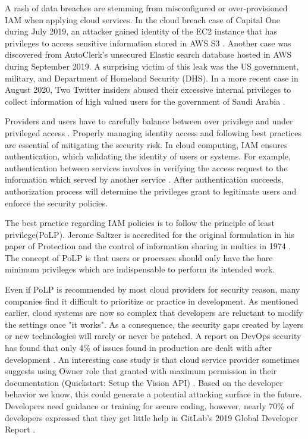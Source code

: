 \documentclass[sigconf]{acmart}
\begin{document}
A rash of data breaches are stemming from misconfigured or over-provisioned IAM when applying cloud services.
In the cloud breach case of Capital One during July 2019, an attacker gained identity of the EC2 instance that has privileges to access sensitive information stored in AWS S3 \cite{Parimi2019}. 
Another case was discovered from AutoClerk's unsecured Elastic search database hosted in AWS during September 2019. A surprising victim of this leak was the US government, military, and Department of Homeland Security (DHS). \cite{Fawkes2020}
In a more recent case in August 2020, Two Twitter insiders abused their excessive internal privileges to collect information of high valued users for the government of Saudi Arabia \cite{Newman2019}.

Providers and users have to carefully balance between over privilege and under privileged access \cite{Sanders2018}. Properly managing identity access and following best practices are essential of mitigating the security risk. 
In cloud computing, 
IAM ensures authentication, which validating the identity of users or systems. For example, authentication between services involves in verifying the access request to the information which served by another service \cite{AlmullaSameeraAbdulrahmanandYeun2010}.
After authentication succeeds, authorization process will determine the privileges grant to legitimate users and enforce the security policies.


The best practice regarding IAM policies is to follow the principle of least privilege(PoLP). Jerome Saltzer is accredited for the original formulation in  his paper of  Protection and the control of information sharing in multics in 1974 \cite{Saltzer1974}. The concept of PoLP is that users or processes should only have the bare minimum privileges which are indispensable to perform its intended work.

Even if PoLP is recommended by most cloud providers for security reason, many companies find it difficult to prioritize or practice in development. 
As mentioned earlier, cloud systems are now so complex that developers are reluctant to modify the settings once "it works". As a consequence, the security gaps created by layers or new technologies will rarely or never be patched. A report on DevOps security has found that only 4\% of issues found in production are dealt with after development \cite{Foremski}. 
An interesting case study is that cloud service provider sometimes suggests using Owner role that granted with maximum permission in their documentation (Quickstart: Setup the Vision API) \cite{GoogleVis}. Based on the developer behavior we know, this could generate a potential attacking surface in the future.
Developers need guidance or training for secure coding, however, nearly 70\% of developers expressed that they get little help in GitLab's 2019 Global Developer Report  \cite{Gitlab2019}.
\end{document}
